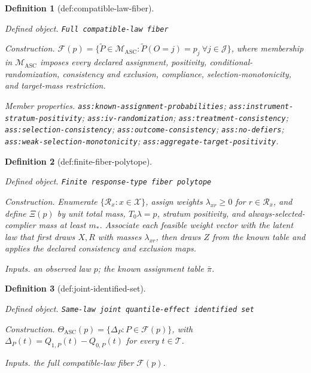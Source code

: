 \documentclass{article}
\newtheorem{definition}{Definition}
\begin{document}
\begin{definition}[def:compatible-law-fiber]\label{def:compatible-law-fiber}
\par\smallskip\noindent\emph{Defined object.} \texttt{Full compatible-\allowbreak{}law fiber}
\par\smallskip\noindent\emph{Construction.} \(\mathcal F(p)=\{\widetilde P\in\mathcal M_{\mathrm{ASC}}:\widetilde P(O=j)=p_j\ \forall j\in\mathcal J\}\), where membership in \(\mathcal M_{\mathrm{ASC}}\) imposes every declared assignment, positivity, conditional-randomization, consistency and exclusion, compliance, selection-monotonicity, and target-mass restriction.
\par\smallskip\noindent\emph{Member properties.} \texttt{ass:\allowbreak{}known-\allowbreak{}assignment-\allowbreak{}probabilities}; \texttt{ass:\allowbreak{}instrument-\allowbreak{}stratum-\allowbreak{}positivity}; \texttt{ass:\allowbreak{}iv-\allowbreak{}randomization}; \texttt{ass:\allowbreak{}treatment-\allowbreak{}consistency}; \texttt{ass:\allowbreak{}selection-\allowbreak{}consistency}; \texttt{ass:\allowbreak{}outcome-\allowbreak{}consistency}; \texttt{ass:\allowbreak{}no-\allowbreak{}defiers}; \texttt{ass:\allowbreak{}weak-\allowbreak{}selection-\allowbreak{}monotonicity}; \texttt{ass:\allowbreak{}aggregate-\allowbreak{}target-\allowbreak{}positivity}.
\end{definition}

\begin{definition}[def:finite-fiber-polytope]\label{def:finite-fiber-polytope}
\par\smallskip\noindent\emph{Defined object.} \texttt{Finite response-\allowbreak{}type fiber polytope}
\par\smallskip\noindent\emph{Construction.} Enumerate \(\{\mathcal R_x:x\in\mathcal X\}\), assign weights \(\lambda_{xr}\ge0\) for \(r\in\mathcal R_x\), and define \(\Xi(p)\) by unit total mass, \(T_0\lambda=p\), stratum positivity, and always-selected-complier mass at least \(m_*\). Associate each feasible weight vector with the latent law that first draws \(X,R\) with masses \(\lambda_{xr}\), then draws \(Z\) from the known table and applies the declared consistency and exclusion maps.
\par\smallskip\noindent\emph{Inputs.} an observed law \(p\); the known assignment table \(\bar\pi\).
\end{definition}

\begin{definition}[def:joint-identified-set]\label{def:joint-identified-set}
\par\smallskip\noindent\emph{Defined object.} \texttt{Same-\allowbreak{}law joint quantile-\allowbreak{}effect identified set}
\par\smallskip\noindent\emph{Construction.} \(\Theta_{\mathrm{ASC}}(p)=\{\Delta_P:P\in\mathcal F(p)\}\), with \(\Delta_P(t)=Q_{1,P}(t)-Q_{0,P}(t)\) for every \(t\in\mathcal T\).
\par\smallskip\noindent\emph{Inputs.} the full compatible-law fiber \(\mathcal F(p)\).
\end{definition}
\end{document}
